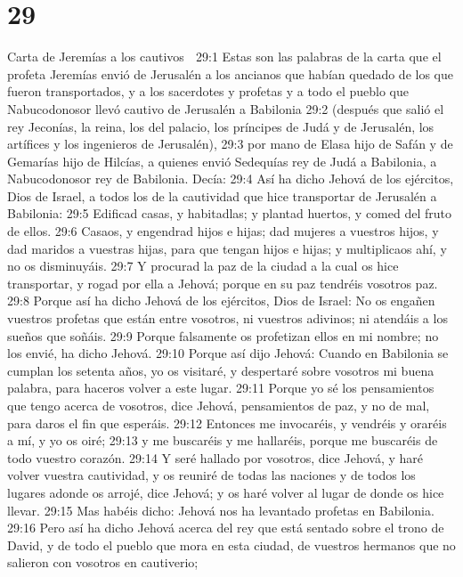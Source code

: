 \chapter{29}

Carta de Jeremías a los cautivos  

29:1 Estas son las palabras de la carta que el profeta Jeremías envió de Jerusalén a los ancianos que habían quedado de los que fueron transportados, y a los sacerdotes y profetas y a todo el pueblo que Nabucodonosor llevó cautivo de Jerusalén a Babilonia  
29:2 (después que salió el rey Jeconías, la reina, los del palacio, los príncipes de Judá y de Jerusalén, los artífices y los ingenieros de Jerusalén), 
29:3 por mano de Elasa hijo de Safán y de Gemarías hijo de Hilcías, a quienes envió Sedequías rey de Judá a Babilonia, a Nabucodonosor rey de Babilonia. Decía:  
29:4 Así ha dicho Jehová de los ejércitos, Dios de Israel, a todos los de la cautividad que hice transportar de Jerusalén a Babilonia:  
29:5 Edificad casas, y habitadlas; y plantad huertos, y comed del fruto de ellos.  
29:6 Casaos, y engendrad hijos e hijas; dad mujeres a vuestros hijos, y dad maridos a vuestras hijas, para que tengan hijos e hijas; y multiplicaos ahí, y no os disminuyáis.  
29:7 Y procurad la paz de la ciudad a la cual os hice transportar, y rogad por ella a Jehová; porque en su paz tendréis vosotros paz.  
29:8 Porque así ha dicho Jehová de los ejércitos, Dios de Israel: No os engañen vuestros profetas que están entre vosotros, ni vuestros adivinos; ni atendáis a los sueños que soñáis.  
29:9 Porque falsamente os profetizan ellos en mi nombre; no los envié, ha dicho Jehová.  
29:10 Porque así dijo Jehová: Cuando en Babilonia se cumplan los setenta años, yo os visitaré, y despertaré sobre vosotros mi buena palabra, para haceros volver a este lugar.  
29:11 Porque yo sé los pensamientos que tengo acerca de vosotros, dice Jehová, pensamientos de paz, y no de mal, para daros el fin que esperáis.  
29:12 Entonces me invocaréis, y vendréis y oraréis a mí, y yo os oiré;  
29:13 y me buscaréis y me hallaréis, porque me buscaréis de todo vuestro corazón. 
29:14 Y seré hallado por vosotros, dice Jehová, y haré volver vuestra cautividad, y os reuniré de todas las naciones y de todos los lugares adonde os arrojé, dice Jehová; y os haré volver al lugar de donde os hice llevar.  
29:15 Mas habéis dicho: Jehová nos ha levantado profetas en Babilonia.  
29:16 Pero así ha dicho Jehová acerca del rey que está sentado sobre el trono de David, y de todo el pueblo que mora en esta ciudad, de vuestros hermanos que no salieron con vosotros en cautiverio;  
